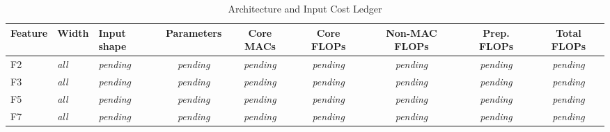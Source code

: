 \begin{table}[!t]
\caption{Architecture and Input Cost Ledger}
\label{tab:cost-ledger}
\centering
\footnotesize
\begin{tabular}{@{}lllcccccc@{}}
\toprule
Feature & Width & Input shape & Parameters & Core MACs & Core FLOPs & Non-MAC FLOPs & Prep. FLOPs & Total FLOPs \\
\midrule
F2 & \textit{all} & \textit{pending} & \textit{pending} & \textit{pending} & \textit{pending} & \textit{pending} & \textit{pending} & \textit{pending} \\
F3 & \textit{all} & \textit{pending} & \textit{pending} & \textit{pending} & \textit{pending} & \textit{pending} & \textit{pending} & \textit{pending} \\
F5 & \textit{all} & \textit{pending} & \textit{pending} & \textit{pending} & \textit{pending} & \textit{pending} & \textit{pending} & \textit{pending} \\
F7 & \textit{all} & \textit{pending} & \textit{pending} & \textit{pending} & \textit{pending} & \textit{pending} & \textit{pending} & \textit{pending} \\
\bottomrule
\end{tabular}
\end{table}
